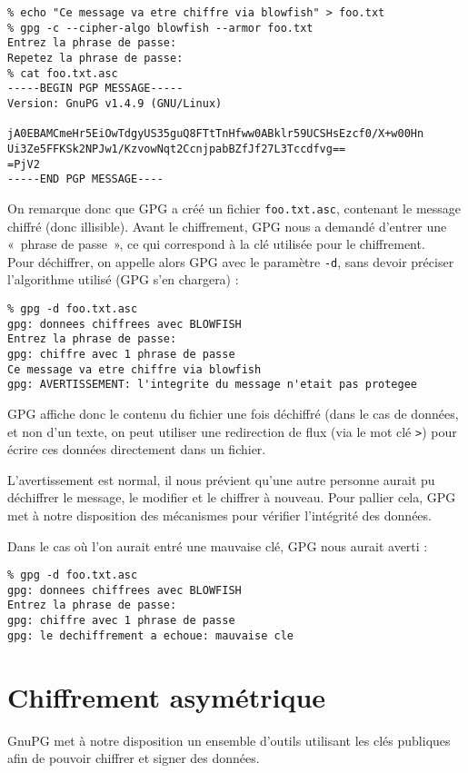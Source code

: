 \begin{lstlisting}
% echo "Ce message va etre chiffre via blowfish" > foo.txt
% gpg -c --cipher-algo blowfish --armor foo.txt
Entrez la phrase de passe: 
Repetez la phrase de passe: 
% cat foo.txt.asc
-----BEGIN PGP MESSAGE-----
Version: GnuPG v1.4.9 (GNU/Linux)

jA0EBAMCmeHr5EiOwTdgyUS35guQ8FTtTnHfww0ABklr59UCSHsEzcf0/X+w00Hn
Ui3Ze5FFKSk2NPJw1/KzvowNqt2CcnjpabBZfJf27L3Tccdfvg==
=PjV2
-----END PGP MESSAGE----
\end{lstlisting}

On remarque donc que GPG a créé un fichier \texttt{foo.txt.asc},
contenant le message chiffré (donc illisible). 
Avant le chiffrement, GPG nous a
demandé d'entrer une «~phrase de passe~», ce qui correspond à la
clé utilisée pour le chiffrement.
\\

Pour déchiffrer, on appelle alors GPG avec le paramètre
\texttt{-d}, sans devoir préciser l'algorithme utilisé (GPG s'en
chargera) : 

\begin{lstlisting}
% gpg -d foo.txt.asc 
gpg: donnees chiffrees avec BLOWFISH
Entrez la phrase de passe: 
gpg: chiffre avec 1 phrase de passe
Ce message va etre chiffre via blowfish
gpg: AVERTISSEMENT: l'integrite du message n'etait pas protegee
\end{lstlisting}

GPG affiche donc le contenu du fichier une fois déchiffré (dans le
cas de données, et non d'un texte, on peut utiliser une
redirection de flux (via le mot clé \texttt{>}) pour écrire ces 
données directement dans un fichier.

L'avertissement est normal, il nous prévient qu'une autre personne
aurait pu déchiffrer le message, le modifier et le chiffrer à
nouveau. Pour pallier cela, GPG met à notre disposition des
mécanismes pour vérifier l'intégrité des données. 

Dans le cas où l'on aurait entré une mauvaise clé, GPG nous
aurait averti : 
\begin{lstlisting}
% gpg -d foo.txt.asc
gpg: donnees chiffrees avec BLOWFISH
Entrez la phrase de passe:
gpg: chiffre avec 1 phrase de passe
gpg: le dechiffrement a echoue: mauvaise cle
\end{lstlisting}

\section{Chiffrement asymétrique}
GnuPG met à notre disposition un ensemble d'outils utilisant les
clés publiques afin de pouvoir chiffrer et signer des données.

